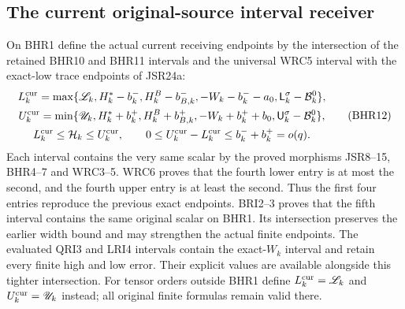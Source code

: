 \documentclass[11pt,a4paper]{article}
\begin{document}
\subsection{The current original-source interval receiver}
On BHR1 define the actual current receiving endpoints
by the intersection of the retained BHR10 and BHR11
intervals and the universal WRC5 interval with the
exact-low trace endpoints of JSR24a:
\[
\begin{gathered}
 L_k^{\rm cur}=\max\{\mathscr L_k,H_k^*-b_k^-,
 H_k^B-b_{B,k}^-,-W_k-b_k^--a_0,
                  \mathsf L_k^\sigma-\mathcal B_k^0\},\\
 U_k^{\rm cur}=\min\{\mathscr U_k,H_k^*+b_k^+,
 H_k^B+b_{B,k}^+,-W_k+b_k^++b_0,
                  \mathsf U_k^\sigma-\mathcal B_k^0\},\\
 L_k^{\rm cur}\leq\mathcal H_k\leq U_k^{\rm cur},
 \qquad0\leq U_k^{\rm cur}-L_k^{\rm cur}
                       \leq b_k^-+b_k^+=o(q).
\end{gathered}\tag{BHR12}
\]
Each interval contains the very same scalar by the
proved morphisms JSR8--15, BHR4--7 and WRC3--5.
WRC6 proves that the fourth lower entry is at most the
second, and the fourth upper entry is at least the second.
Thus the first four entries reproduce the previous exact
endpoints. BRI2--3 proves that the fifth interval contains the
same original scalar on BHR1. Its intersection preserves the
earlier width bound and may strengthen the actual finite endpoints.
The evaluated QRI3 and LRI4 intervals contain the exact-$W_k$
interval and retain every finite high and low error. Their explicit
values are available alongside this tighter intersection.
For tensor orders outside BHR1 define
$L_k^{\rm cur}=\mathscr L_k$ and
$U_k^{\rm cur}=\mathscr U_k$ instead; all original
finite formulas remain valid there.
\end{document}
